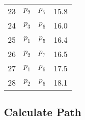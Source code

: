 \documentclass[
	final,
	a4paper,
	oneside,
	parskip=full,
	headings=standardclasses,
	headings=big,
	pointednumbers
]{scrartcl}
\begin{document}
\begin{minipage}[t]{.5\linewidth}
\begin{center}
\begin{tabular}[t]{|r|c|c|r|}
                \rowcolor[HTML]{999999} 23 & $p_{2}$ & $p_{5}$ & 15.8 \\
                \rowcolor[HTML]{999999} 24 & $p_{3}$ & $p_{6}$ & 16.0 \\
                \rowcolor[HTML]{999999} 25 & $p_{1}$ & $p_{5}$ & 16.4 \\
                \rowcolor[HTML]{999999} 26 & $p_{2}$ & $p_{7}$ & 16.5 \\
                \rowcolor[HTML]{999999} 27 & $p_{1}$ & $p_{6}$ & 17.5 \\
                \rowcolor[HTML]{999999} 28 & $p_{2}$ & $p_{6}$ & 18.1 \\
                \hline
            \end{tabular}
        \end{center}
    \end{minipage}

    \newpage


    \subsection*{Calculate Path}
\end{document}
